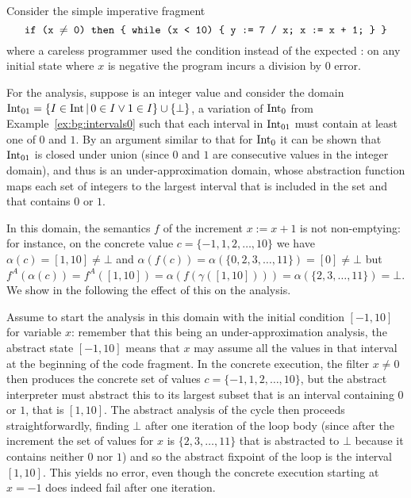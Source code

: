 \begin{example}\label{ex:uai:non-ne-impair-analysis}
	Consider the simple imperative fragment
	\[
	\texttt{if (x $\neq$ 0) then \{ while (x < 10) \{ y := 7 / x; x := x + 1; \} \}}
	\]
	where a careless programmer used the condition  instead of the expected : on any initial state where $x$ is negative the program incurs a division by $0$ error.

	For the analysis, suppose  is an integer value and consider the domain $\text{Int}_{01} = \{ I \in \text{Int} \,\vert\, 0 \in I \lor 1 \in I \} \cup \{ \bot \}$, a variation of $\text{Int}_0$ from Example~\ref{ex:bg:intervals0} such that each interval in $\text{Int}_{01}$ must contain at least one of $0$ and $1$.
	By an argument similar to that for $\text{Int}_0$ it can be shown that $\text{Int}_{01}$ is closed under union (since $0$ and $1$ are consecutive values in the integer domain), and thus is an under-approximation domain, whose abstraction function maps each set of integers to the largest interval that is included in the set and that contains $0$ or $1$.

	In this domain, the semantics $f$ of the increment $x := x + 1$ is not non-emptying: for instance, on the concrete value $c = \{-1, 1, 2, \dots, 10 \}$ we have $\alpha(c) = [1, 10] \neq \bot$ and $\alpha(f(c)) = \alpha(\{ 0, 2, 3, \dots, 11 \}) = [0] \neq \bot$ but $f^A(\alpha(c)) = f^A([1, 10]) = \alpha(f(\gamma([1, 10]))) = \alpha(\{ 2, 3, \dots, 11 \}) = \bot$. We show in the following the effect of this on the analysis.

	Assume to start the analysis in this domain with the initial condition $[-1, 10]$ for variable $x$: remember that this being an under-approximation analysis, the abstract state $[-1, 10]$ means that $x$ may assume all the values in that interval at the beginning of the code fragment.
	In the concrete execution, the filter $x\neq 0$ then produces the concrete set of values $c = \{-1, 1, 2, \dots, 10 \}$, but the abstract interpreter must abstract this to its largest subset that is an interval containing $0$ or $1$, that is $[1, 10]$. The abstract analysis of the cycle then proceeds straightforwardly, finding $\bot$ after one iteration of the loop body (since after the increment the set of values for $x$ is $\{2, 3, \dots, 11 \}$ that is abstracted to $\bot$ because it contains neither $0$ nor $1$) and so the abstract fixpoint of the loop is the interval $[1, 10]$.
	This yields no error, even though the concrete execution starting at $x = -1$ does indeed fail after one iteration.
\end{example}

